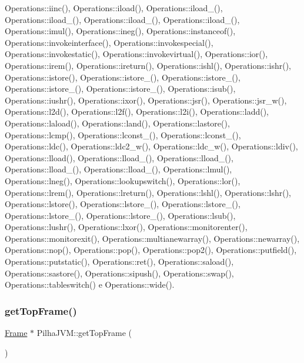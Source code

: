 Operations\+::iinc(), Operations\+::iload(), Operations\+::iload\+\_(), Operations\+::iload\+\_(), Operations\+::iload\+\_(), Operations\+::iload\+\_(), Operations\+::imul(), Operations\+::ineg(), Operations\+::instanceof(), Operations\+::invokeinterface(), Operations\+::invokespecial(), Operations\+::invokestatic(), Operations\+::invokevirtual(), Operations\+::ior(), Operations\+::irem(), Operations\+::ireturn(), Operations\+::ishl(), Operations\+::ishr(), Operations\+::istore(), Operations\+::istore\+\_(), Operations\+::istore\+\_(), Operations\+::istore\+\_(), Operations\+::istore\+\_(), Operations\+::isub(), Operations\+::iushr(), Operations\+::ixor(), Operations\+::jsr(), Operations\+::jsr\+\_\+w(), Operations\+::l2d(), Operations\+::l2f(), Operations\+::l2i(), Operations\+::ladd(), Operations\+::laload(), Operations\+::land(), Operations\+::lastore(), Operations\+::lcmp(), Operations\+::lconst\+\_(), Operations\+::lconst\+\_(), Operations\+::ldc(), Operations\+::ldc2\+\_\+w(), Operations\+::ldc\+\_\+w(), Operations\+::ldiv(), Operations\+::lload(), Operations\+::lload\+\_(), Operations\+::lload\+\_(), Operations\+::lload\+\_(), Operations\+::lload\+\_(), Operations\+::lmul(), Operations\+::lneg(), Operations\+::lookupswitch(), Operations\+::lor(), Operations\+::lrem(), Operations\+::lreturn(), Operations\+::lshl(), Operations\+::lshr(), Operations\+::lstore(), Operations\+::lstore\+\_(), Operations\+::lstore\+\_(), Operations\+::lstore\+\_(), Operations\+::lstore\+\_(), Operations\+::lsub(), Operations\+::lushr(), Operations\+::lxor(), Operations\+::monitorenter(), Operations\+::monitorexit(), Operations\+::multianewarray(), Operations\+::newarray(), Operations\+::nop(), Operations\+::pop(), Operations\+::pop2(), Operations\+::putfield(), Operations\+::putstatic(), Operations\+::ret(), Operations\+::saload(), Operations\+::sastore(), Operations\+::sipush(), Operations\+::swap(), Operations\+::tableswitch() e Operations\+::wide().

\mbox{\label{classPilhaJVM_aa0e43da476df6147c86c8cc3d6899718}} 
\subsubsection{\texorpdfstring{get\+Top\+Frame()}{getTopFrame()}}
{\footnotesize\ttfamily \hyperlink{classFrame}{Frame} $\ast$ Pilha\+J\+V\+M\+::get\+Top\+Frame (\begin{DoxyParamCaption}{ }\end{DoxyParamCaption})}



